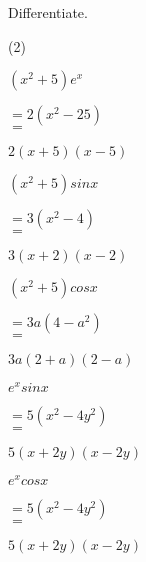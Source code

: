 \clearpage
\noindent Differentiate.
\begin{tasks}(2)
    \task \begin{exercise}$(x^2+5)e^x$
              \begin{envSolution}
                 $ =2(x^2-25)   $\\ 
                 $ =$			 
                     \begin{shortsolution}
  	                    $ 2(x+5)(x-5)$
                     \end{shortsolution}
              \end{envSolution}%
          \end{exercise}
 
    \task \begin{exercise}$(x^2+5)sinx$
              \begin{envSolution}
                 $ =3(x^2-4)   $\\ 
                 $ =$			 
                     \begin{shortsolution}
  	                    $ 3(x+2)(x-2)$
                     \end{shortsolution}
              \end{envSolution}%
          \end{exercise}
 
    \task \begin{exercise}$(x^2+5)cosx$
              \begin{envSolution}
                 $ =3a(4-a^2)   $\\ 
                 $ =$			 
                     \begin{shortsolution}
  	                    $ 3a(2+a)(2-a)$
                     \end{shortsolution}
              \end{envSolution}%
          \end{exercise}

    \task \begin{exercise}$e^x sinx$
              \begin{envSolution}
                 $ =5(x^2-4y^2)   $\\
                 $ =$			 
                     \begin{shortsolution}
  	                    $ 5(x+2y)(x-2y)$
                     \end{shortsolution}
              \end{envSolution}%
          \end{exercise}

    \task \begin{exercise}$e^x cosx$
              \begin{envSolution}
                 $ =5(x^2-4y^2)   $\\
                 $ =$			 
                     \begin{shortsolution}
  	                    $ 5(x+2y)(x-2y)$
                     \end{shortsolution}
              \end{envSolution}%
          \end{exercise}
 
\end{tasks}
